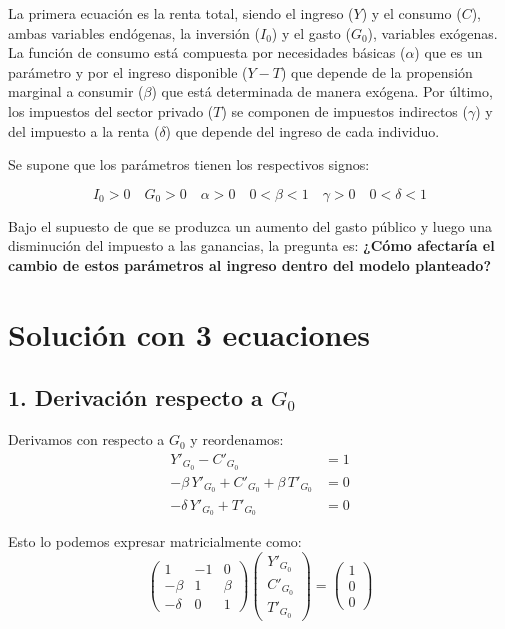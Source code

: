 \documentclass{article}
\begin{document}
La primera ecuación es la renta total, siendo el ingreso ($Y$) y el consumo ($C$), ambas variables endógenas, la inversión ($I_0$) y el gasto ($G_0$), variables exógenas. La función de consumo está compuesta por necesidades básicas ($\alpha$) que es un parámetro y por el ingreso disponible ($Y - T$) que depende de la propensión marginal a consumir ($\beta$) que está determinada de manera exógena. Por último, los impuestos del sector privado ($T$) se componen de impuestos indirectos ($\gamma$) y del impuesto a la renta ($\delta$) que depende del ingreso de cada individuo.

Se supone que los parámetros tienen los respectivos signos:

\[
I_0 > 0 \quad G_0 > 0 \quad \alpha > 0 \quad 0 < \beta < 1 \quad \gamma > 0 \quad 0 < \delta < 1
\]

Bajo el supuesto de que se produzca un aumento del gasto público y luego una disminución del impuesto a las ganancias, la pregunta es: \textbf{¿Cómo afectaría el cambio de estos parámetros al ingreso dentro del modelo planteado?}

\newpage
\section*{Solución con 3 ecuaciones}

\subsection*{1. Derivación respecto a \(G_0\)}

Derivamos con respecto a \(G_0\) y reordenamos:
\begin{align*}
Y'_{G_0} - C'_{G_0} &= 1 \\[1mm]
-\beta\,Y'_{G_0} + C'_{G_0} + \beta\,T'_{G_0} &= 0 \\[1mm]
-\delta\,Y'_{G_0} + T'_{G_0} &= 0
\end{align*}

Esto lo podemos expresar matricialmente como:
\[
\begin{pmatrix}
1 & -1 & 0\\[0.8mm]
-\beta & 1 & \beta\\[0.8mm]
-\delta & 0 & 1
\end{pmatrix}
\begin{pmatrix}
Y'_{G_0}\\[0.8mm]
C'_{G_0}\\[0.8mm]
T'_{G_0}
\end{pmatrix}
=
\begin{pmatrix}
1\\[0.8mm]
0\\[0.8mm]
0
\end{pmatrix}
\]
\end{document}

